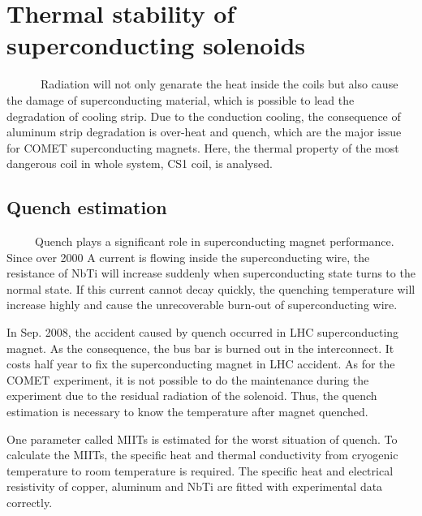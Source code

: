 \chapter{Thermal stability of superconducting solenoids}
~~~~~~Radiation will not only genarate the heat inside the coils but also cause the damage of superconducting material, which is possible to lead the degradation of cooling strip.
Due to the conduction cooling, the consequence of aluminum strip degradation is over-heat and quench, which are the major issue for COMET superconducting magnets.
Here, the thermal property of the most dangerous coil in whole system, CS1 coil, is analysed.

\section{Quench estimation}
~~~~~Quench plays a significant role in superconducting magnet performance.
Since over 2000 A current is flowing inside the superconducting wire, the resistance of NbTi will increase suddenly when superconducting state turns to the normal state.
If this current cannot decay quickly, the quenching temperature will increase highly and cause the unrecoverable burn-out of superconducting wire.

In Sep. 2008, the accident caused by quench occurred in LHC superconducting magnet.
As the consequence, the bus bar is burned out in the interconnect.
It costs half year to fix the superconducting magnet in LHC accident.
As for the COMET experiment, it is not possible to do the maintenance during the experiment due to the residual radiation of the solenoid.
Thus, the quench estimation is necessary to know the temperature after magnet quenched.

One parameter called MIITs is estimated for the worst situation of quench.
To calculate the MIITs, the specific heat and thermal conductivity from cryogenic temperature to room temperature is required.
The specific heat and electrical resistivity of copper, aluminum and NbTi are fitted with experimental data correctly.


